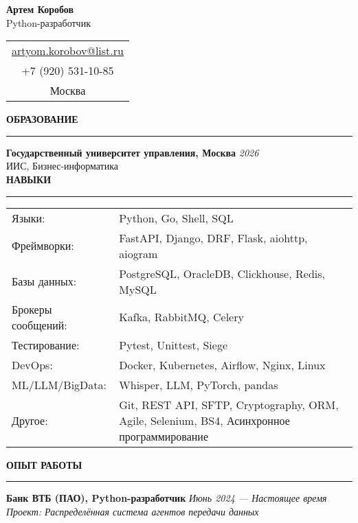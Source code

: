 \documentclass[11pt]{article}
\newcommand{\sectionheader}[1]{%
    \vspace{8pt}%
    \noindent\textbf{\large #1} \\
    \vspace{-8pt}%
    \rule{\textwidth}{0.5pt}%
    \vspace{6pt}%
}
\begin{document}
\begin{center}
    \LARGE \textbf{Артем Коробов} \\
    \large Python-разработчик \\[5pt]
\end{center}
\begin{center}
    \begin{tabular}{c}
        \href{mailto:artyom.korobov@list.ru}{artyom.korobov@list.ru} \\
        +7 (920) 531-10-85 \\
        Москва \\
    \end{tabular}
\end{center}
\sectionheader{ОБРАЗОВАНИЕ}
\textbf{Государственный университет управления, Москва} \hfill \textit{2026} \\
ИИС, Бизнес-информатика \\
\sectionheader{НАВЫКИ}
\begin{tabular}{@{}p{} p{}@{}}
    Языки: & Python, Go, Shell, SQL \\
    Фреймворки: & FastAPI, Django, DRF, Flask, aiohttp, aiogram \\
    Базы данных: & PostgreSQL, OracleDB, Clickhouse, Redis, MySQL \\
    Брокеры сообщений: & Kafka, RabbitMQ, Celery \\
    Тестирование: & Pytest, Unittest, Siege \\
    DevOps: & Docker, Kubernetes, Airflow, Nginx, Linux \\
    ML/LLM/BigData: & Whisper, LLM, PyTorch, pandas \\
    Другое: & Git, REST API, SFTP, Cryptography, ORM, Agile, Selenium, BS4, Асинхронное программирование \\
\end{tabular}
\sectionheader{ОПЫТ РАБОТЫ}
\textbf{Банк ВТБ (ПАО), Python-разработчик} \hfill \textit{Июнь 2024 — Настоящее время} \\
\textit{Проект: Распределённая система агентов передачи данных}
\end{document}
